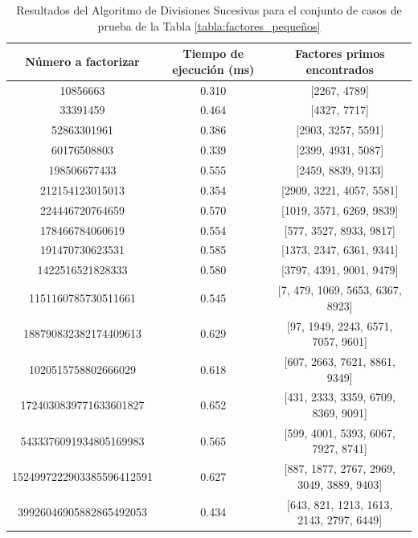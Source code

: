     \begin{table}[H]
        \centering
        \begin{adjustbox}{width=\columnwidth,center}
        \begin{tabular}{ccc}
        \toprule
        Número a factorizar & Tiempo de ejecución (ms) & Factores primos encontrados\\
        \midrule
        10856663 & 0.310 & [2267, 4789]\\
        33391459 & 0.464 & [4327, 7717]\\
        52863301961 & 0.386 & [2903, 3257, 5591]\\
        60176508803 & 0.339 & [2399, 4931, 5087]\\
        198506677433 & 0.555 & [2459, 8839, 9133]\\
        212154123015013 & 0.354 & [2909, 3221, 4057, 5581]\\
        224446720764659 & 0.570 & [1019, 3571, 6269, 9839]\\
        178466784060619 & 0.554 & [577, 3527, 8933, 9817]\\
        191470730623531 & 0.585 & [1373, 2347, 6361, 9341]\\
        1422516521828333 & 0.580 & [3797, 4391, 9001, 9479]\\
        1151160785730511661 & 0.545 & [7, 479, 1069, 5653, 6367, 8923]\\
        188790832382174409613 & 0.629 & [97, 1949, 2243, 6571, 7057, 9601]\\
        1020515758802666029 & 0.618 & [607, 2663, 7621, 8861, 9349]\\
        1724030839771633601827 & 0.652 & [431, 2333, 3359, 6709, 8369, 9091]\\
        5433376091934805169983 & 0.565 & [599, 4001, 5393, 6067, 7927, 8741]\\
        1524997222903385596412591 & 0.627 & [887, 1877, 2767, 2969, 3049, 3889, 9403]\\
        39926046905882865492053 & 0.434 & [643, 821, 1213, 1613, 2143, 2797, 6449]\\

        \bottomrule
        \end{tabular}
        \end{adjustbox}
    \caption{Resultados del Algoritmo de Divisiones Sucesivas para el conjunto de casos de prueba de la Tabla \ref{tabla:factores_pequeños}}
        \label{tab:res-trial_1}
    \end{table}

